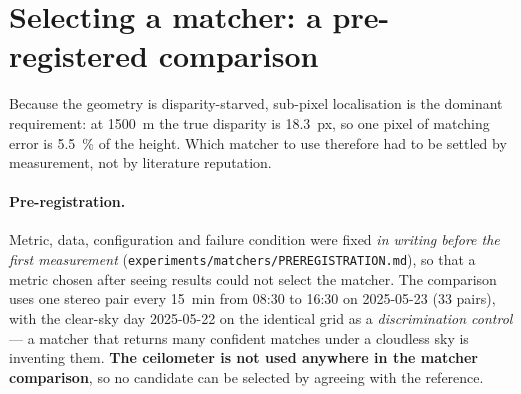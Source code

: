 \documentclass[11pt,a4paper]{article}
\begin{document}
\section{Selecting a matcher: a pre-registered comparison}
\label{sec:matcher}

Because the geometry is disparity-starved, sub-pixel localisation is the dominant requirement:
at \SI{1500}{\metre} the true disparity is \SI{18.3}{px}, so one pixel of matching error is
\SI{5.5}{\percent} of the height. Which matcher to use therefore had to be settled by
measurement, not by literature reputation.

\paragraph{Pre-registration.} Metric, data, configuration and failure condition were fixed
\emph{in writing before the first measurement} (\texttt{experiments/matchers/PREREGISTRATION.md}),
so that a metric chosen after seeing results could not select the matcher. The comparison uses
one stereo pair every \SI{15}{\minute} from 08:30 to 16:30 on 2025-05-23 (33 pairs), with the
clear-sky day 2025-05-22 on the identical grid as a \emph{discrimination control} --- a matcher
that returns many confident matches under a cloudless sky is inventing them. \textbf{The
ceilometer is not used anywhere in the matcher comparison}, so no candidate can be selected by
agreeing with the reference.
\end{document}
